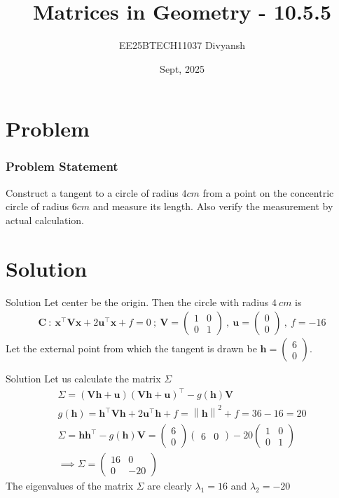 \documentclass{beamer}
\title{Matrices in Geometry - 10.5.5}
\author{EE25BTECH11037  Divyansh}
\date{Sept, 2025}
\let\vec\mathbf
\providecommand{\brak}[1]{\ensuremath{\left(#1\right)}}
\theoremstyle{remark}
\providecommand{\norm}[1]{\left\lVert#1\right\rVert}
\newcommand{\myvec}[1]{\ensuremath{\begin{pmatrix}#1\end{pmatrix}}}
\begin{document}
    
    \maketitle
    
    
    \section{Problem}
    \begin{frame}
    \frametitle{Problem Statement}
    Construct a tangent to a circle of radius $4cm$ from a point on the concentric circle of radius $6cm$ and measure its length. Also verify the measurement by actual calculation.
    \end{frame}
    
    \section{Solution}
    \begin{frame}{Solution}
    Let center be the origin. Then the circle with radius $4 \ cm$ is
\begin{align}
    \vec{C} \ : \ \vec{x}^{\top}\vec{V}\vec{x} + 2\vec{u}^{\top}\vec{x} + f=0 \ ; \ \vec{V}=\myvec{1&0\\0&1} \ , \ \vec{u}=\myvec{0\\0} \ , \ f=-16
\end{align}
Let the external point from which the tangent is drawn be $\vec{h}=\myvec{6\\0}$.
    \end{frame}
    
    \begin{frame}{Solution}
    Let us calculate the matrix $\Sigma$
\begin{align}
    \Sigma=\brak{\vec{V}\vec{h} + \vec{u}}\brak{\vec{V}\vec{h} + \vec{u}}^{\top} - g\brak{\vec{h}}\vec{V}\\
    g\brak{\vec{h}}=\vec{h}^{\top}\vec{V}\vec{h} + 2\vec{u}^{\top}\vec{h} + f =\norm{\vec{h}}^2 +f =36-16 =20\\
    \Sigma = \vec{h}\vec{h}^{\top} - g\brak{\vec{h}}\vec{V}=\myvec{6 \\ 0}\myvec{6 & 0} - 20\myvec{ 1& 0 \\ 0 &1}\\
    \implies \Sigma=\myvec{16 & 0 \\ 0 & -20}
\end{align}
The eigenvalues of the matrix $\Sigma$ are clearly $\lambda_1=16$ and $\lambda_2=-20$
    \end{frame}
\end{document}
